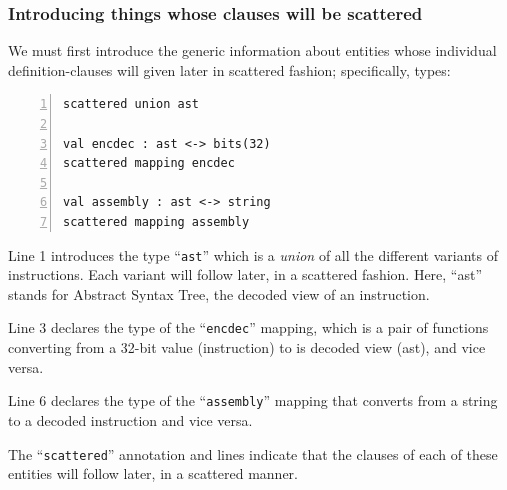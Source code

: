 \documentclass[aspectratio=169]{beamer}
\newcommand{\slidefont}{\scriptsize}
\newcommand{\cf}{\scriptsize\tt}
\begin{document}
\begin{frame}[fragile]
  \frametitle{Introducing things whose clauses will be scattered}

  \slidefont

  We must first introduce the generic information about entities whose
  individual definition-clauses will given later in scattered fashion;
  specifically, types:

  \begin{Verbatim}[frame=single, numbers=left, label = File riscv\_insts\_begin.sail]
scattered union ast

val encdec : ast <-> bits(32)
scattered mapping encdec

val assembly : ast <-> string
scattered mapping assembly
  \end{Verbatim}

  \begin{minipage}{\textwidth}
    Line 1 introduces the type ``{\cf ast}'' which is a \emph{union}
    of all the different variants of instructions.  Each variant will
    follow later, in a scattered fashion.  Here, ``ast'' stands for
    Abstract Syntax Tree, the decoded view of an instruction.

    \vspace{1ex}

    Line 3 declares the type of the ``{\cf encdec}'' mapping, which is
    a pair of functions converting from a 32-bit value (instruction)
    to is decoded view (ast), and vice versa.

    \vspace{1ex}

    Line 6 declares the type of the ``{\cf assembly}''
    mapping that converts from a string to a decoded instruction and
    vice versa.

    \vspace{1ex}

    The ``{\cf scattered}'' annotation and lines indicate that the
    clauses of each of these entities will follow later, in a
    scattered manner.
  \end{minipage}

\end{frame}

\end{document}
